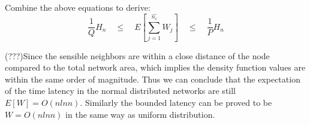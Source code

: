 Combine the above equations to derive:
$$
\frac{1}{Q}H_n  \quad \leq \quad E[\sum_{j=1}^{\hat{n_i}}W_j]  \quad \leq \quad \frac{1}{P}H_n
$$

(???)Since the sensible neighbors are within a close distance of the node
compared to the total network area,
which implies the density function values are within the same order of magnitude.
Thus we can conclude that the expectation of the time latency in the normal
distributed networks are still $E[W]=O(nlnn)$.
Similarly the bounded latency can be proved to be $W=O(nlnn)$ in the same way as
uniform distribution.



